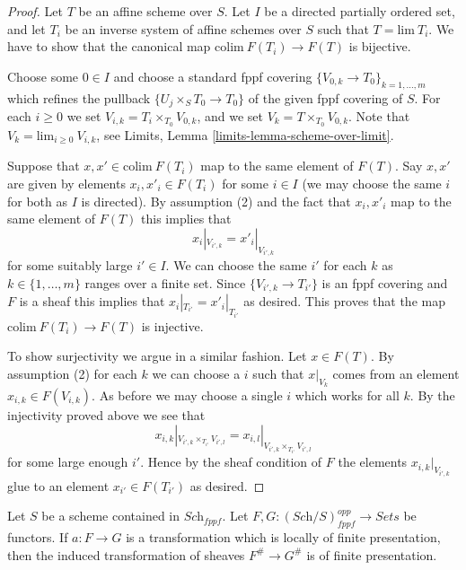\begin{proof}
Let $T$ be an affine scheme over $S$.
Let $I$ be a directed partially ordered set, and let
$T_i$ be an inverse system of affine schemes over $S$ such that
$T = \text{lim}\ T_i$. We have to show that the canonical
map $\text{colim}\ F(T_i) \to F(T)$ is bijective.

\medskip\noindent
Choose some $0 \in I$ and choose a standard fppf covering
$\{V_{0, k} \to T_{0}\}_{k = 1, \ldots, m}$ which refines
the pullback $\{U_j \times_S T_0 \to T_0\}$ of the given fppf covering of $S$.
For each $i \geq 0$ we set $V_{i, k} = T_i \times_{T_0} V_{0, k}$, and
we set $V_k = T \times_{T_0} V_{0, k}$. Note that
$V_k = \text{lim}_{i \geq 0}\ V_{i, k}$, see
Limits, Lemma \ref{limits-lemma-scheme-over-limit}.

\medskip\noindent
Suppose that $x, x' \in \text{colim}\ F(T_i)$ map to the same
element of $F(T)$. Say $x, x'$ are given by elements $x_i, x'_i \in F(T_i)$
for some $i \in I$ (we may choose the same $i$ for both as $I$ is directed).
By assumption (2) and the fact that $x_i, x'_i$ map to the same element
of $F(T)$ this implies that
$$
x_i|_{V_{i', k}} = x'_i|_{V_{i', k}}
$$
for some suitably large $i' \in I$. We can choose the same $i'$ for each
$k$ as $k \in \{1, \ldots, m\}$ ranges over a finite set.
Since $\{V_{i', k} \to T_{i'}\}$
is an fppf covering and $F$ is a sheaf this implies that
$x_i|_{T_{i'}} = x'_i|_{T_{i'}}$ as desired. This proves that the map
$\text{colim}\ F(T_i) \to F(T)$ is injective.

\medskip\noindent
To show surjectivity we argue in a similar fashion.
Let $x \in F(T)$. By assumption (2) for each $k$ we
can choose a $i$ such that $x|_{V_k}$ comes from an
element $x_{i, k} \in F(V_{i, k})$. As before we may choose a
single $i$ which works for all $k$. By the injectivity
proved above we see that
$$
x_{i, k}|_{V_{i', k} \times_{T_{i'}} V_{i', l}}
=
x_{i, l}|_{V_{i', k} \times_{T_{i'}} V_{i', l}}
$$
for some large enough $i'$. Hence by the sheaf condition of $F$
the elements $x_{i, k}|_{V_{i', k}}$ glue to an element $x_{i'} \in F(T_{i'})$
as desired.
\end{proof}

\begin{lemma}
\label{lemma-sheafify-finite-presentation-map}
Let $S$ be a scheme contained in $\textit{Sch}_{fppf}$.
Let $F, G : (\textit{Sch}/S)_{fppf}^{opp} \to \textit{Sets}$ be functors.
If $a : F \to G$ is a transformation which is locally of finite
presentation, then the induced transformation of sheaves
$F^\# \to G^\#$ is of finite presentation.
\end{lemma}


